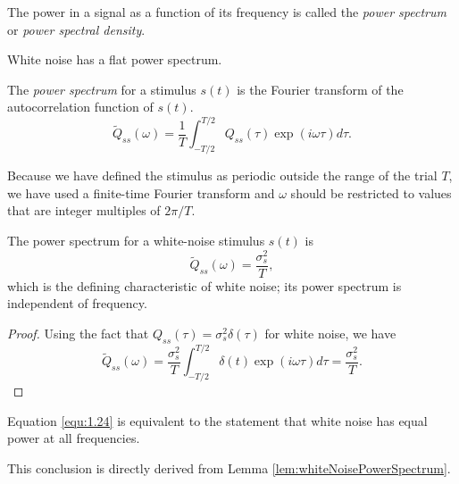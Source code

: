 \begin{defn}
  \label{defn:stimulus-power-spectrum}
  The power in a signal as a function of its frequency is called the \emph{power spectrum} or \emph{power spectral density}.
\end{defn}

\begin{rem}
  White noise has a flat power spectrum.
\end{rem}

\begin{defn}
  \label{defn:stimulus-power-spectrum}
  The \emph{power spectrum} for a stimulus $s(t)$ is the Fourier transform of the autocorrelation function of $s(t)$.
  \begin{equation}
    \label{equ:1.40}
    \widetilde{Q}_{ss}(\omega) = \frac{1}{T} \int_{-T/2}^{T/2}Q_{ss}(\tau)\exp(i\omega\tau) d\tau.
  \end{equation}
\end{defn}

\begin{rem}
  Because we have defined the stimulus as periodic outside the range of the trial $T$, we have used a finite-time Fourier transform and $\omega$ should be restricted to values that are integer multiples of $2\pi / T$.
\end{rem}

\begin{lem}
  \label{lem:whiteNoisePowerSpectrum}
  The power spectrum for a white-noise stimulus $s(t)$ is
  \begin{equation}
    \label{equ:1.41}
    \widetilde{Q}_{ss}(\omega) = \frac{\sigma_s^2}{T},
  \end{equation}
  which is the defining characteristic of white noise; its power spectrum is independent of frequency.
\end{lem}
\begin{proof}
  Using the fact that $Q_{ss}(\tau) = \sigma_s^2\delta(\tau)$ for white noise, we have
  \begin{displaymath}
    \widetilde{Q}_{ss}(\omega) = \frac{\sigma_s^2}{T} \int_{-T/2}^{T/2}\delta(t)\exp(i\omega\tau) d\tau = \frac{\sigma_s^2}{T}.
  \end{displaymath}
\end{proof}

\begin{prop}
  \label{prop:equivalence}
  Equation \ref{equ:1.24} is equivalent to the statement that white noise has equal power at all frequencies.
\end{prop}
\begin{solution}
  This conclusion is directly derived from Lemma \ref{lem:whiteNoisePowerSpectrum}.
\end{solution}

